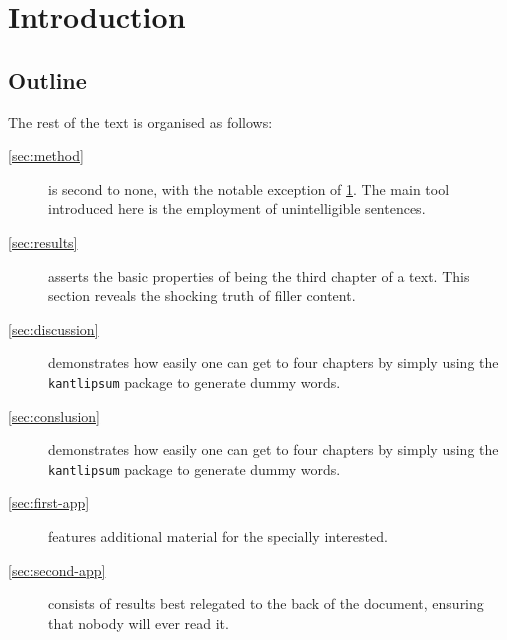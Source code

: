 \chapter{Introduction}
\label{sec:intro}





\section{Outline}

The rest of the text is organised as follows:
\begin{description}
    \item[\cref{sec:method}]
    is second to none, with the notable exception of \cref{sec:intro}.
    The main tool introduced here is the employment of unintelligible sentences.

    \item[\cref{sec:results}]
    asserts the basic properties of being the third chapter of a text.
    This section reveals the shocking truth of filler content.

    \item[\cref{sec:discussion}]
    demonstrates how easily one can get to four chapters by simply using
    the \texttt{kantlipsum} package to generate dummy words.
    
    \item[\cref{sec:conslusion}]
    demonstrates how easily one can get to four chapters by simply using
    the \texttt{kantlipsum} package to generate dummy words.

    \item[\cref{sec:first-app}]
    features additional material for the specially interested.

    \item[\cref{sec:second-app}]
    consists of results best relegated to the back of the document,
    ensuring that nobody will ever read it.
\end{description}